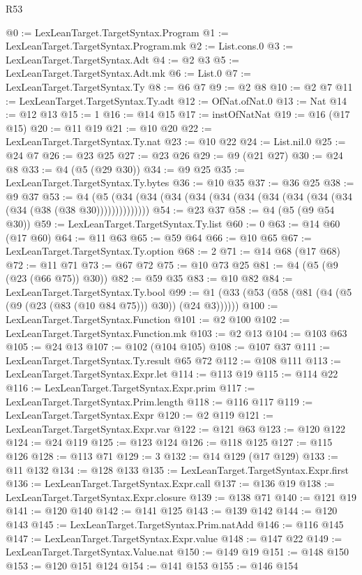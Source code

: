 \begin{lexlean}{R53}
\begin{coremodule}
@0 := LexLeanTarget.TargetSyntax.Program
@1 := LexLeanTarget.TargetSyntax.Program.mk
@2 := List.cons.{0}
@3 := LexLeanTarget.TargetSyntax.Adt
@4 := @2 @3
@5 := LexLeanTarget.TargetSyntax.Adt.mk
@6 := List.{0}
@7 := LexLeanTarget.TargetSyntax.Ty
@8 := @6 @7
@9 := @2 @8
@10 := @2 @7
@11 := LexLeanTarget.TargetSyntax.Ty.adt
@12 := OfNat.ofNat.{0}
@13 := Nat
@14 := @12 @13
@15 := 1
@16 := @14 @15
@17 := instOfNatNat
@19 := @16 (@17 @15)
@20 := @11 @19
@21 := @10 @20
@22 := LexLeanTarget.TargetSyntax.Ty.nat
@23 := @10 @22
@24 := List.nil.{0}
@25 := @24 @7
@26 := @23 @25
@27 := @23 @26
@29 := @9 (@21 @27)
@30 := @24 @8
@33 := @4 (@5 (@29 @30))
@34 := @9 @25
@35 := LexLeanTarget.TargetSyntax.Ty.bytes
@36 := @10 @35
@37 := @36 @25
@38 := @9 @37
@53 := @4 (@5 (@34 (@34 (@34 (@34 (@34 (@34 (@34 (@34 (@34 (@34 (@34 (@38 (@38 @30))))))))))))))
@54 := @23 @37
@58 := @4 (@5 (@9 @54 @30))
@59 := LexLeanTarget.TargetSyntax.Ty.list
@60 := 0
@63 := @14 @60 (@17 @60)
@64 := @11 @63
@65 := @59 @64
@66 := @10 @65
@67 := LexLeanTarget.TargetSyntax.Ty.option
@68 := 2
@71 := @14 @68 (@17 @68)
@72 := @11 @71
@73 := @67 @72
@75 := @10 @73 @25
@81 := @4 (@5 (@9 (@23 (@66 @75)) @30))
@82 := @59 @35
@83 := @10 @82
@84 := LexLeanTarget.TargetSyntax.Ty.bool
@99 := @1 (@33 (@53 (@58 (@81 (@4 (@5 (@9 (@23 (@83 (@10 @84 @75))) @30)) (@24 @3))))))
@100 := LexLeanTarget.TargetSyntax.Function
@101 := @2 @100
@102 := LexLeanTarget.TargetSyntax.Function.mk
@103 := @2 @13
@104 := @103 @63
@105 := @24 @13
@107 := @102 (@104 @105)
@108 := @107 @37
@111 := LexLeanTarget.TargetSyntax.Ty.result @65 @72
@112 := @108 @111
@113 := LexLeanTarget.TargetSyntax.Expr.let
@114 := @113 @19
@115 := @114 @22
@116 := LexLeanTarget.TargetSyntax.Expr.prim
@117 := LexLeanTarget.TargetSyntax.Prim.length
@118 := @116 @117
@119 := LexLeanTarget.TargetSyntax.Expr
@120 := @2 @119
@121 := LexLeanTarget.TargetSyntax.Expr.var
@122 := @121 @63
@123 := @120 @122
@124 := @24 @119
@125 := @123 @124
@126 := @118 @125
@127 := @115 @126
@128 := @113 @71
@129 := 3
@132 := @14 @129 (@17 @129)
@133 := @11 @132
@134 := @128 @133
@135 := LexLeanTarget.TargetSyntax.Expr.first
@136 := LexLeanTarget.TargetSyntax.Expr.call
@137 := @136 @19
@138 := LexLeanTarget.TargetSyntax.Expr.closure
@139 := @138 @71
@140 := @121 @19
@141 := @120 @140
@142 := @141 @125
@143 := @139 @142
@144 := @120 @143
@145 := LexLeanTarget.TargetSyntax.Prim.natAdd
@146 := @116 @145
@147 := LexLeanTarget.TargetSyntax.Expr.value
@148 := @147 @22
@149 := LexLeanTarget.TargetSyntax.Value.nat
@150 := @149 @19
@151 := @148 @150
@153 := @120 @151 @124
@154 := @141 @153
@155 := @146 @154

\end{coremodule}
\end{lexlean}
